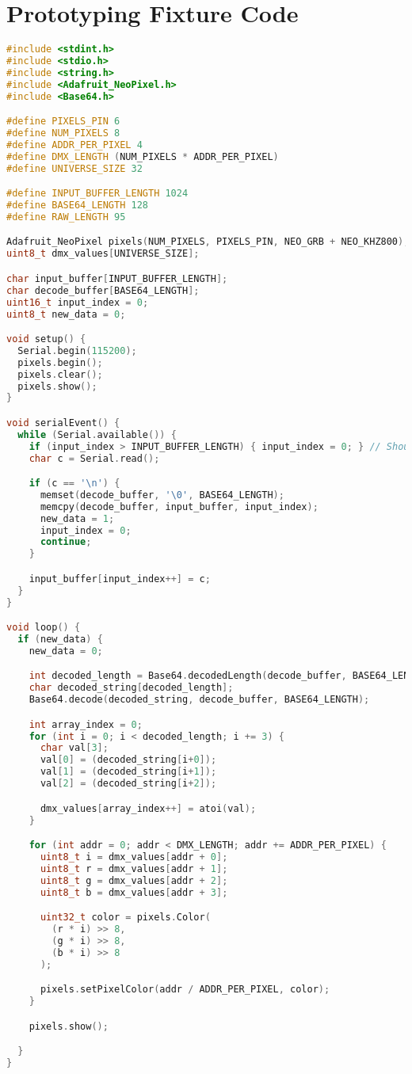 \chapter{Prototyping Fixture Code}\label{appendix:prototyping_fixture}

\begin{lstlisting}[language=C++]
#include <stdint.h>
#include <stdio.h>
#include <string.h>
#include <Adafruit_NeoPixel.h>
#include <Base64.h>

#define PIXELS_PIN 6
#define NUM_PIXELS 8
#define ADDR_PER_PIXEL 4
#define DMX_LENGTH (NUM_PIXELS * ADDR_PER_PIXEL)
#define UNIVERSE_SIZE 32

#define INPUT_BUFFER_LENGTH 1024
#define BASE64_LENGTH 128
#define RAW_LENGTH 95

Adafruit_NeoPixel pixels(NUM_PIXELS, PIXELS_PIN, NEO_GRB + NEO_KHZ800);
uint8_t dmx_values[UNIVERSE_SIZE];

char input_buffer[INPUT_BUFFER_LENGTH];
char decode_buffer[BASE64_LENGTH];
uint16_t input_index = 0;
uint8_t new_data = 0;

void setup() {
  Serial.begin(115200);
  pixels.begin();
  pixels.clear();
  pixels.show();
}

void serialEvent() {
  while (Serial.available()) {
    if (input_index > INPUT_BUFFER_LENGTH) { input_index = 0; } // Should never hit this
    char c = Serial.read();

    if (c == '\n') {
      memset(decode_buffer, '\0', BASE64_LENGTH);
      memcpy(decode_buffer, input_buffer, input_index);
      new_data = 1;
      input_index = 0;
      continue;
    }

    input_buffer[input_index++] = c;
  }
}

void loop() {
  if (new_data) {
    new_data = 0;

    int decoded_length = Base64.decodedLength(decode_buffer, BASE64_LENGTH);
    char decoded_string[decoded_length];
    Base64.decode(decoded_string, decode_buffer, BASE64_LENGTH);

    int array_index = 0;
    for (int i = 0; i < decoded_length; i += 3) {
      char val[3];
      val[0] = (decoded_string[i+0]);
      val[1] = (decoded_string[i+1]);
      val[2] = (decoded_string[i+2]);

      dmx_values[array_index++] = atoi(val);
    }

    for (int addr = 0; addr < DMX_LENGTH; addr += ADDR_PER_PIXEL) {
      uint8_t i = dmx_values[addr + 0];
      uint8_t r = dmx_values[addr + 1];
      uint8_t g = dmx_values[addr + 2];
      uint8_t b = dmx_values[addr + 3];

      uint32_t color = pixels.Color(
        (r * i) >> 8,
        (g * i) >> 8,
        (b * i) >> 8
      );

      pixels.setPixelColor(addr / ADDR_PER_PIXEL, color);
    }

    pixels.show();

  }
}

\end{lstlisting}
